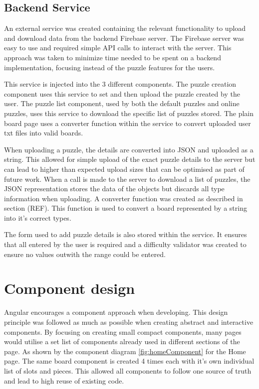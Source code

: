 \documentclass{l4proj}
\begin{document}
\subsection{Backend Service}
An external service was created containing the relevant functionality to upload and download data from the backend Firebase server. The Firebase server was easy to use and required simple API calls to interact with the server. This approach was taken to minimize time needed to be spent on a backend implementation, focusing instead of the puzzle features for the users. 

This service is injected into the 3 different components. The puzzle creation component uses this service to set and then upload the puzzle created by the user. The puzzle list component, used by both the default puzzles and online puzzles, uses this service to download the specific list of puzzles stored. The plain board page uses a converter function within the service to convert uploaded user txt files into valid boards.

When uploading a puzzle, the details are converted into JSON and uploaded as a string. This allowed for simple upload of the exact puzzle details to the server but can lead to higher than expected upload sizes that can be optimised as part of future work. When a call is made to the server to download a list of puzzles, the JSON representation stores the data of the objects but discards all type information when uploading. A converter function was created as described in section (REF). This function is used to convert a board represented by a string into it's correct types.

The form used to add puzzle details is also stored within the service. It ensures that all entered by the user is required and a difficulty validator was created to ensure no values outwith the range could be entered. 

\section{Component design}
Angular encourages a component approach when developing. This design principle was followed as much as possible when creating abstract and interactive components. By focusing on creating small compact components, many pages would utilise a set list of components already used in different sections of the page. As shown by the component diagram \ref{fig:homeComponent} for the Home page. The same board component is created 4 times each with it's own individual list of slots and pieces. This allowed all components to follow one source of truth and lead to high reuse of existing code. 
\end{document}
